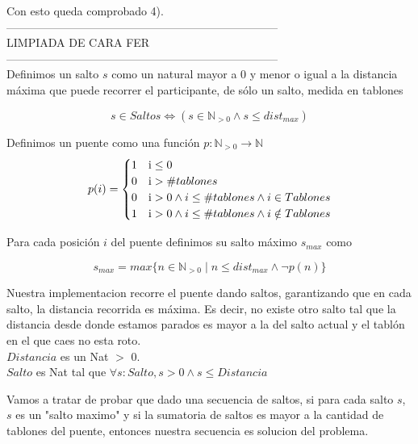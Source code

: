 Con esto queda comprobado 4).
\\
------------------------------------------------------------------------\\
LIMPIADA DE CARA FER\\
------------------------------------------------------------------------\\
Definimos un salto $s$ como un natural mayor a 0 y menor o igual a la distancia 
máxima que puede recorrer el participante, de sólo un salto, medida en tablones

\begin{displaymath}
	s \in Saltos \Leftrightarrow (s \in \mathbb{N}_{> 0} \land s \leq dist_{max})
\end{displaymath}

Definimos un puente como una función $p: \mathbb{N}_{>0} \to \mathbb{N}$ 
\begin{displaymath}
	p(i) = \begin{cases} 
					1 &\mbox i \leq 0 \\ 
					0 &\mbox i > \#tablones \\
					0 &\mbox i > 0 \land i \leq \#tablones \land i \in Tablones \\
					1 &\mbox i > 0 \land i \leq \#tablones \land i \notin Tablones \\
				\end{cases} %
\end{displaymath}

Para cada posición $i$ del puente definimos su salto máximo $s_{max}$ como 

\begin{displaymath}
	s_{max} = max \{n \in \mathbb{N}_{>0} \mid n \leq dist_{max} \land  \neg p(n)\}
\end{displaymath}

Nuestra implementacion recorre el puente dando saltos, garantizando que en cada salto, la distancia recorrida es m\'axima. Es decir, no existe otro salto tal que la distancia desde donde estamos parados es mayor a la del salto actual y el tabl\'on en el que caes no esta roto.\\
$Distancia$ es un Nat $>$ 0. \\
$Salto$ es Nat tal que $\forall s:Salto, s > 0 \wedge s \leq Distancia$
 
Vamos a tratar de probar que dado una secuencia de saltos, si para cada salto $s$, $s$ es un "salto maximo" y si la sumatoria de saltos es mayor a la cantidad de tablones del puente, entonces nuestra secuencia es solucion del problema.

